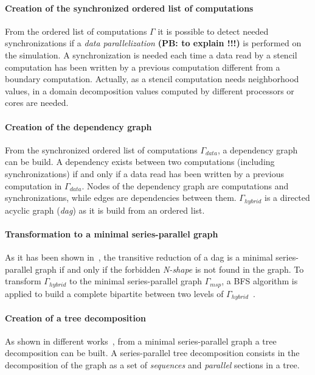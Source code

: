 \paragraph{Creation of the synchronized ordered list of computations} From the ordered list of computations $\Gamma$ it is possible to detect needed synchronizations if a \emph{data parallelization} \textbf{(PB: to explain !!!)} is performed on the simulation. A synchronization is needed each time a data read by a stencil computation has been written by a previous computation different from a boundary computation. Actually, as a stencil computation needs neighborhood values, in a domain decomposition values computed by different processors or cores are needed.

\paragraph{Creation of the dependency graph} From the synchronized ordered list of computations $\Gamma_{data}$, a dependency graph can be build. A dependency exists between two computations (including synchronizations) if and only if a data read has been written by a previous computation in $\Gamma_{data}$. Nodes of the dependency graph are computations and synchronizations, while edges are dependencies between them. $\Gamma_{hybrid}$ is a directed acyclic graph (\emph{dag}) as it is build from an ordered list.

\paragraph{Transformation to a minimal series-parallel graph} As it has been shown in~\cite{Valdes:1979:RSP:800135.804393}, the transitive reduction of a dag is a minimal series-parallel graph if and only if the forbidden \emph{N-shape} is not found in the graph. To transform $\Gamma_{hybrid}$ to the minimal series-parallel graph $\Gamma_{msp}$, a BFS algorithm is applied to build a complete bipartite between two levels of $\Gamma_{hybrid}$~\cite{Mitchell:2004:CMV:1082101.1082117}.

\paragraph{Creation of a tree decomposition} As shown in different works~\cite{Valdes:1979:RSP:800135.804393,Schoenmakers95anew}, from a minimal series-parallel graph a tree decomposition can be built. A series-parallel tree decomposition consists in the decomposition of the graph as a set of \emph{sequences} and \emph{parallel} sections in a tree. 

